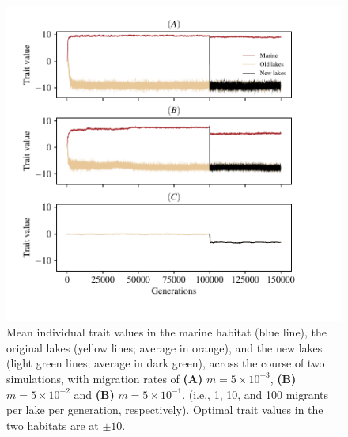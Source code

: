 \documentclass{article}
\begin{document}
\begin{figure}
    \begin{center}
          \includegraphics[width=1.0\linewidth]{Final_Plots/Pheno_Time_supp.pdf}
          \caption{
        Mean individual trait values in the marine habitat (blue line),
                the original lakes (yellow lines; average in orange),
                and the new lakes (light green lines; average in dark green),
                across the course of two simulations, with migration rates of
                \textbf{(A)} $m=5 \times 10^{-3}$,
                \textbf{(B)} $m=5 \times 10^{-2}$ and
        \textbf{(B)} $m=5 \times 10^{-1}$.
                (i.e., 1, 10, and 100 migrants per lake per generation, respectively).
                Optimal trait values in the two habitats are at $\pm 10$.
        }
          \label{fig:phenotype_time_supp}
    \end{center}
\end{figure}
\end{document}
